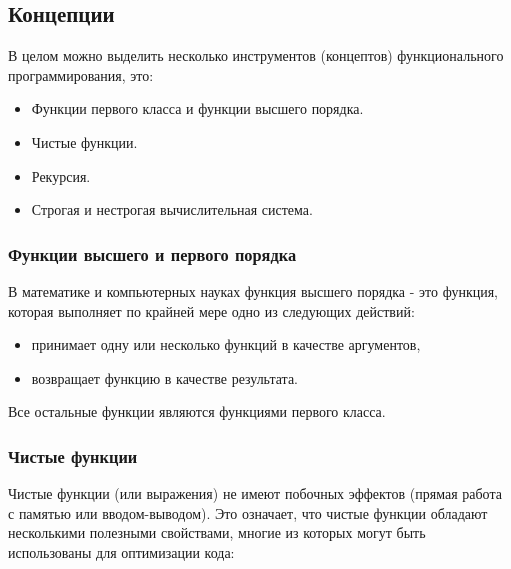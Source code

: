 \subsection{Концепции}

В целом можно выделить несколько инструментов (концептов) функционального программирования, это:

\begin{itemize}
	\item Функции первого класса и функции высшего порядка.
	\item Чистые функции.
	\item Рекурсия.
	\item Строгая и нестрогая вычислительная система.
\end{itemize}

\subsubsection{Функции высшего и первого порядка}

В математике и компьютерных науках функция высшего порядка - это функция, которая выполняет по крайней мере одно из следующих действий:

\begin{itemize}
	\item принимает одну или несколько функций в качестве аргументов,
	\item возвращает функцию в качестве результата.
\end{itemize}

Все остальные функции являются функциями первого класса.

\subsubsection{Чистые функции}

Чистые функции (или выражения) не имеют побочных эффектов (прямая работа с памятью или вводом-выводом).
Это означает, что чистые функции обладают несколькими полезными свойствами, многие из которых могут быть использованы для оптимизации кода:

